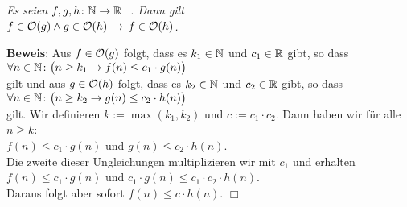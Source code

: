 \begin{Satz}[Transitivit\"at]
{\em
  Es seien $f,g,h \colon {\mathbb N} \rightarrow {{\mathbb R}_+}$.  Dann gilt \\[0.1cm]
  \hspace*{1.3cm} $f \in \mathcal{O}(g) \wedge g \in \mathcal{O}(h) \,\rightarrow\, f \in \mathcal{O}(h)$.
}
\end{Satz}
\textbf{Beweis}: Aus $f \in \mathcal{O}(g)$ folgt, dass es $k_1 \in {\mathbb N}$ und $c_1 \in {\mathbb R}$ gibt, so dass\\[0.1cm]
\hspace*{1.3cm} 
$\forall n \in {\mathbb N} \colon\bigl( n \geq k_1 \rightarrow f(n) \leq c_1 \cdot g(n)\bigr)$ \\[0.1cm]
gilt und aus $g \in \mathcal{O}(h)$ folgt, dass es $k_2 \in {\mathbb N}$ und $c_2 \in {\mathbb R}$ gibt, so dass \\[0.1cm]
\hspace*{1.3cm} 
$\forall n \in {\mathbb N} \colon\bigl( n \geq k_2 \rightarrow g(n) \leq c_2 \cdot h(n)\bigr)$ \\[0.1cm]
gilt.  Wir definieren $k:= \max(k_1,k_2)$ und $c := c_1 \cdot c_2$.  Dann haben wir f\"ur alle
$n \geq k$:\\[0.1cm]
\hspace*{1.3cm} $f(n) \leq c_1\cdot g(n)$ und $g(n) \leq c_2 \cdot h(n)$. \\[0.1cm]
Die zweite dieser Ungleichungen multiplizieren wir mit $c_1$ und erhalten \\[0.1cm]
\hspace*{1.3cm} $f(n) \leq c_1\cdot g(n)$ und $c_1\cdot g(n) \leq c_1\cdot c_2 \cdot h(n)$. \\[0.1cm]
Daraus folgt aber sofort $f(n) \leq c \cdot h(n)$. \hspace*{\fill} $\Box$

